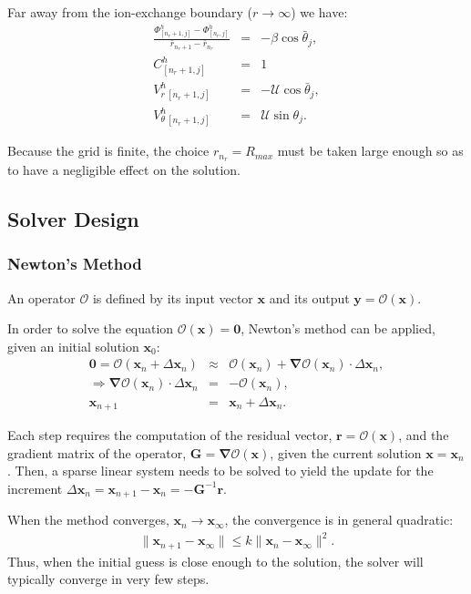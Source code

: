 \documentclass[final]{elsarticle}
\newcommand\bnabla{\boldsymbol{\nabla}}
\newcommand\bG{\boldsymbol{G}}
\newcommand\bx{\boldsymbol{x}}
\newcommand\by{\boldsymbol{y}}
\newcommand\br{\boldsymbol{r}}
\newcommand\bzero{\boldsymbol{0}}
\newcommand\cO{\mathcal{O}}
\newcommand\cU{\mathscr{U}}
\begin{document}
Far away from the ion-exchange boundary ($r\rightarrow\infty$) we have:
\begin{eqnarray*}
\frac{\varPhi^h_{[n_r + 1, j]} - \varPhi^h_{[n_r, j]}}{\bar{r}_{n_r + 1} - \bar{r}_{n_r}} 
 & = & -\beta \cos\bar{\theta}_j, \\
C^h_{[n_r + 1, j]} & = & 1 \\
V_r^h{}_{[n_r + 1, j]} & = & -\cU \cos\bar{\theta}_j, \\
V_\theta^h{}_{[n_r + 1, j]} & = & \cU \sin\theta_j.
\end{eqnarray*}

Because the grid is finite, the choice 
$r_{n_r} = R_{max}$ must be taken large enough so as to have a negligible effect
on the solution.

\subsection{Solver Design}
\subsubsection{Newton's Method}
An operator $\cO$ is defined by its input vector $\bx$ and its output 
$\by = \cO(\bx)$.

In order to solve the equation $\cO(\bx) = \bzero$, Newton's method can 
be applied, given an initial solution $\bx_0$:
\begin{eqnarray*}
\bzero = \cO(\bx_n + \Delta \bx_n) &\approx& \cO(\bx_n) + \bnabla \cO(\bx_n)\cdot\Delta\bx_n, \\
\Rightarrow \bnabla \cO(\bx_n) \cdot \Delta \bx_n &=& -\cO(\bx_n), \\
\bx_{n+1} &=& \bx_{n} + \Delta \bx_n. 
\end{eqnarray*}

Each step requires the computation of the residual vector, $\br = \cO(\bx)$, and
the gradient matrix of the operator, $\bG = \bnabla \cO(\bx)$, 
given the current solution $\bx = \bx_n$.
Then, a sparse linear system needs to be solved to yield the update for the 
increment $\Delta \bx_n = \bx_{n+1} - \bx_n = -\bG^{-1} \br$.

When the method converges, $\bx_n \rightarrow \bx_\infty$, 
the convergence is in general quadratic:
\begin{eqnarray*}
\|\bx_{n+1} - \bx_\infty\| \le k \|\bx_{n} - \bx_\infty\|^2.
\end{eqnarray*}
Thus, when the initial guess is close enough to the solution, the solver
will typically converge in very few steps.
\end{document}
